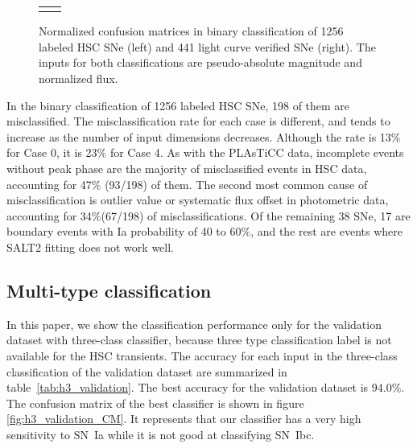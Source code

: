 \documentclass[proof]{pasj01}
\begin{document}
\begin{figure}[htbp]
\begin{tabular}{cc}
\begin{minipage}{0.5\hsize}
\begin{center}
            \end{center}
        \end{minipage}
    \end{tabular}
    \caption{%
  Normalized confusion matrices in binary classification of 1256 labeled HSC SNe (left) and 441 light curve verified SNe (right).
  The inputs for both classifications are pseudo-absolute magnitude and normalized flux.
}%
    \label{fig:h2_test_CM}
\end{figure}
%

In the binary classification of 1256 labeled HSC SNe, 198 of them are misclassified.
The misclassification rate for each case is different, and tends to increase as the number of input dimensions decreases.
Although the rate is 13\% for Case 0, it is 23\% for Case 4.
As with the PLAsTiCC data, incomplete events without peak phase are the majority of misclassified events in HSC data, accounting for 47\% (93/198) of them.
The second most common cause of misclassification is outlier value or systematic flux offset in photometric data, accounting for 34\%(67/198) of misclassifications.
Of the remaining 38 SNe, 17 are boundary events with Ia probability of 40 to 60\%, and the rest are events where SALT2 fitting does not work well.

%
%
\subsection{Multi-type classification}
\label{sec:h3}
%
In this paper, we show the classification performance only for the validation dataset with three-class classifier, because three type classification label is not available for the HSC transients.
%
The accuracy for each input in the three-class classification of the validation dataset are summarized in table\ \ref{tab:h3_validation}.
The best accuracy for the validation dataset is 94.0\%.
The confusion matrix of the best classifier is shown in figure \ref{fig:h3_validation_CM}.
It represents that our classifier has a very high sensitivity to SN~Ia while it is not good at classifying SN~Ibc.
\end{document}
